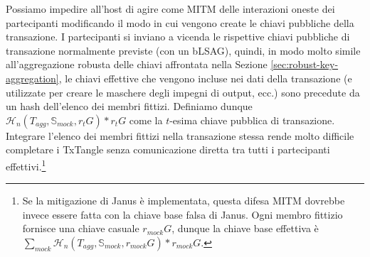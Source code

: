 \begin{enumerate}
    Possiamo impedire all'host di agire come MITM delle interazioni oneste dei partecipanti modificando il modo in cui vengono create le chiavi pubbliche della transazione. I partecipanti si inviano a vicenda le rispettive chiavi pubbliche di transazione normalmente previste (con un bLSAG), quindi, in modo molto simile all'aggregazione robusta delle chiavi affrontata nella Sezione \ref{sec:robust-key-aggregation}, le chiavi effettive che vengono incluse nei dati della transazione (e utilizzate per creare le maschere degli impegni di output, ecc.) sono precedute da un hash dell'elenco dei membri fittizi. Definiamo dunque $\mathcal{H}_n(T_{agg},\mathbb{S}_{mock},r_t G)*r_t G$ come la $t$-esima chiave pubblica di transazione. Integrare l'elenco dei membri fittizi nella transazione stessa rende molto difficile completare i TxTangle senza comunicazione diretta tra tutti i partecipanti effettivi.\footnote{Se la mitigazione di Janus è implementata, questa difesa MITM dovrebbe invece essere fatta con la chiave base falsa di Janus. Ogni membro fittizio fornisce una chiave casuale $r_{mock} G$, dunque la chiave base effettiva è $\sum_{mock} \mathcal{H}_n(T_{agg},\mathbb{S}_{mock},r_{mock} G)*r_{mock} G$.}%
\end{enumerate}

